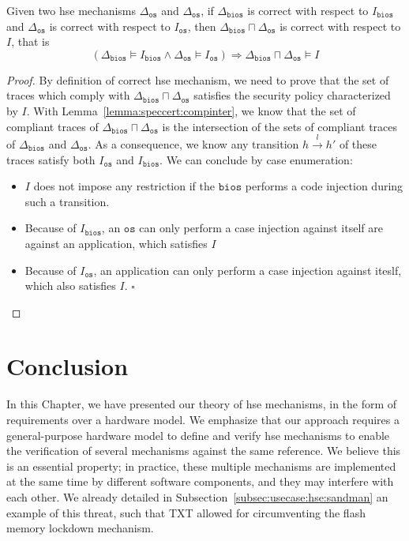 \begin{theorem}
  Given two \ac{hse} mechanisms \( \Delta_{\mathtt{os}} \) and
  \( \Delta_{\mathtt{os}} \), if \( \Delta_{\mathtt{bios}} \) is correct with
  respect to \( I_{\mathtt{bios}} \) and \( \Delta_{\mathtt{os}} \) is correct
  with respect to \( I_{\mathtt{os}} \), then
  \( \Delta_{\mathtt{bios}} \sqcap \Delta_{\mathtt{os}} \) is correct with
  respect to \( I \), that is
  \[
    (\Delta_{\mathtt{bios}} \models I_{\mathtt{bios}} \wedge
    \Delta_{\mathtt{os}} \models I_{\mathtt{os}}) \Rightarrow
    \Delta_{\mathtt{bios}} \sqcap \Delta_{\mathtt{os}} \models I
  \]

  \begin{proof}
    By definition of correct \ac{hse} mechanism, we need to prove that the set
    of traces which comply with
    \( \Delta_{\mathtt{bios}} \sqcap \Delta_{\mathtt{os}} \) satisfies the
    security policy characterized by \( I \).
    With Lemma~\ref{lemma:speccert:compinter}, we know that the set of compliant
    traces of \( \Delta_{\mathtt{bios}} \sqcap \Delta_{\mathtt{os}} \) is the
    intersection of the sets of compliant traces of \( \Delta_{\mathtt{bios}} \)
    and \( \Delta_{\mathtt{os}} \).
    As a consequence, we know any transition \( h \xrightarrow{l} h' \) of these
    traces satisfy both \( I_{\mathtt{os}} \) and \( I_{\mathtt{bios}} \).
    We can conclude by case enumeration:
    \begin{itemize}
    \item \( I \) does not impose any restriction if the \( \mathtt{bios} \)
      performs a code injection during such a transition.
    \item Because of \( I_{\mathtt{bios}} \), an \( \mathtt{os} \) can only
      perform a case injection against itself are against an application, which
      satisfies \( I \)
    \item Because of \( I_{\mathtt{os}} \), an application can only perform a
      case injection against iteslf, which also satisfies \( I \). \hfill
      \( \square \)
    \end{itemize}
  \end{proof}
\end{theorem}

\section{Conclusion}

In this Chapter, we have presented our theory of \ac{hse} mechanisms, in the
form of requirements over a hardware model.
%
We emphasize that our approach requires a general-purpose hardware model to
define and verify \ac{hse} mechanisms to enable the verification of several
mechanisms against the same reference.
%
We believe this is an essential property; in practice, these multiple mechanisms
are implemented at the same time by different software components, and they may
interfere with each other.
%
We already detailed in Subsection~\ref{subsec:usecase:hse:sandman} an example of
this threat, such that TXT allowed for circumventing the flash memory lockdown
mechanism.

